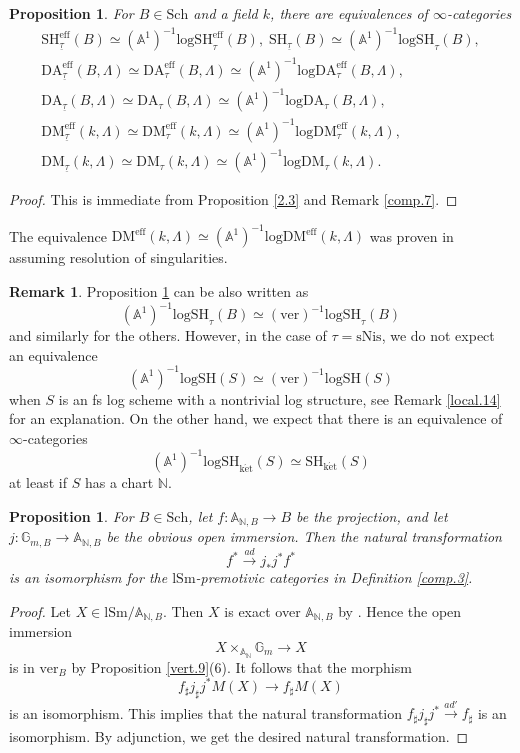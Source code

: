 \documentclass[10pt]{amsart}
\newtheorem{prop}[thm]{Proposition}
\theoremstyle{definition}
\newtheorem{rmk}[thm]{Remark}
\theoremstyle{remark}
\numberwithin{equation}{subsection}
\newcommand{\A}{\mathbb{A}}
\newcommand{\G}{\mathbb{G}}
\newcommand{\N}{\mathbb{N}}
\newcommand{\ul}{\underline}
\newcommand{\DM}{\mathrm{DM}}
\newcommand{\eff}{{\mathrm{eff}}}
\newcommand{\SH}{\mathrm{SH}}
\newcommand{\logSH}{\mathrm{logSH}}
\newcommand{\logDA}{\mathrm{log}\mathrm{DA}}
\newcommand{\DA}{\mathrm{DA}}
\newcommand{\Sch}{\mathrm{Sch}}
\newcommand{\lSm}{\mathrm{lSm}}
\newcommand{\logDMeff}{\mathrm{log}\mathrm{DM}^{\mathrm{eff}}}
\newcommand{\logDM}{\mathrm{log}{\mathrm{DM}}}
\newcommand{\DMeff}{\mathrm{DM}^{\mathrm{eff}}}
\newcommand{\ver}{\mathrm{ver}}
\newcommand{\sNis}{\mathrm{sNis}}
\newcommand{\ketale}{\mathrm{k\acute{e}t}}
\begin{document}
\begin{prop}
\label{comp.8}
For $B\in \Sch$ and a field $k$,
there are equivalences of $\infty$-categories
\begin{gather*}
\SH_{\ul{\tau}}^\eff(B)
\simeq
(\A^1)^{-1}\logSH_{\tau}^\eff(B),
\;
\SH_{\ul{\tau}}(B)
\simeq
(\A^1)^{-1}\logSH_{\tau}(B),
\\
\DA_{\ul{\tau}}^\eff(B,\Lambda)
\simeq
\DA_{\tau}^\eff(B,\Lambda)
\simeq
(\A^1)^{-1}\logDA_{\tau}^\eff(B,\Lambda),
\\
\DA_{\ul{\tau}}(B,\Lambda)
\simeq
\DA_{\tau}(B,\Lambda)
\simeq
(\A^1)^{-1}\logDA_{\tau}(B,\Lambda),
\\
\DM_{\ul{\tau}}^\eff(k,\Lambda)
\simeq
\DM_{\tau}^\eff(k,\Lambda)
\simeq
(\A^1)^{-1}\logDM_{\tau}^\eff(k,\Lambda),
\\
\DM_{\ul{\tau}}(k,\Lambda)
\simeq
\DM_{\tau}(k,\Lambda)
\simeq
(\A^1)^{-1}\logDM_{\tau}(k,\Lambda).
\end{gather*}
\end{prop}
\begin{proof}
This is immediate from Proposition \ref{2.3} and Remark \ref{comp.7}.
\end{proof}

The equivalence $\DMeff(k,\Lambda)
\simeq
(\A^1)^{-1}\logDMeff(k,\Lambda)$ was proven in \cite[Theorem 8.2.16]{logDM} assuming resolution of singularities.

\begin{rmk}
Proposition \ref{comp.8} can be also written as
\[
(\A^1)^{-1} \logSH_{\tau}(B)
\simeq
(\ver)^{-1} \logSH_{\tau}(B)
\]
and similarly for the others.
However,
in the case of $\tau=\sNis$,
we do not expect an equivalence
\[
(\A^1)^{-1} \logSH(S)
\simeq
(\ver)^{-1} \logSH(S)
\]
when $S$ is an fs log scheme with a nontrivial log structure,
see Remark \ref{local.14} for an explanation.
On the other hand, we expect that there is an equivalence of $\infty$-categories
\[
(\A^1)^{-1}\logSH_{\ketale}(S)
\simeq
\SH_{\ketale}(S)
\]
at least if $S$ has a chart $\N$.
\end{rmk}

\begin{prop}
\label{comp.6}
For $B\in \Sch$,
let $f\colon \A_{\N,B}\to B$ be the projection, and let $j\colon \G_{m,B} \to \A_{\N,B}$ be the obvious open immersion.
Then the natural transformation
\[
f^*\xrightarrow{ad} j_*j^* f^*
\]
is an isomorphism for the $\lSm$-premotivic categories in \textup{Definition \ref{comp.3}}.
\end{prop}
\begin{proof}
Let $X\in \lSm/\A_{\N,B}$.
Then $X$ is exact over $\A_{\N,B}$ by \cite[Proposition III.2.5.2(1), III.2.5.3(3)]{Ogu}.
Hence the open immersion
\[
X\times_{\A_{\N}}\G_m \to X
\]
is in $\ver_{B}$ by Proposition \ref{vert.9}(6).
It follows that the morphism
\[
f_\sharp j_\sharp j^*M(X)
\to
f_\sharp M(X) 
\]
is an isomorphism.
This implies that the natural transformation $f_\sharp j_\sharp j^* \xrightarrow{ad'} f_\sharp$ is an isomorphism.
By adjunction, we get the desired natural transformation.
\end{proof}
\end{document}
